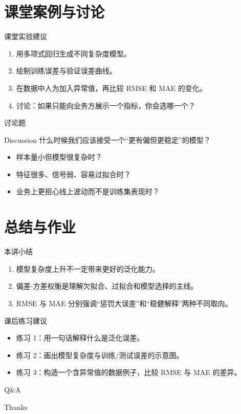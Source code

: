 \documentclass[aspectratio=169,professionalfonts]{beamer}
\begin{document}
\section{课堂案例与讨论}

\begin{frame}{课堂实验建议}
    \begin{enumerate}
        \item 用多项式回归生成不同复杂度模型。
        \item 绘制训练误差与验证误差曲线。
        \item 在数据中人为加入异常值，再比较 RMSE 和 MAE 的变化。
        \item 讨论：如果只能向业务方展示一个指标，你会选哪一个？
    \end{enumerate}
\end{frame}

\begin{frame}{讨论题}
    \begin{block}{Discussion}
        什么时候我们应该接受一个“更有偏但更稳定”的模型？
    \end{block}

    \begin{itemize}
        \item 样本量小但模型很复杂时？
        \item 特征很多、信号弱、容易过拟合时？
        \item 业务上更担心线上波动而不是训练集表现时？
    \end{itemize}
\end{frame}

\section{总结与作业}

\begin{frame}{本讲小结}
    \begin{enumerate}
        \item 模型复杂度上升不一定带来更好的泛化能力。
        \item 偏差-方差权衡是理解欠拟合、过拟合和模型选择的主线。
        \item RMSE 与 MAE 分别强调“惩罚大误差”和“稳健解释”两种不同取向。
    \end{enumerate}
\end{frame}

\begin{frame}{课后练习建议}
    \begin{itemize}
        \item 练习 1：用一句话解释什么是泛化误差。
        \item 练习 2：画出模型复杂度与训练/测试误差的示意图。
        \item 练习 3：构造一个含异常值的数据例子，比较 RMSE 与 MAE 的差异。
    \end{itemize}
\end{frame}

\begin{frame}[plain]
    \centering
    \vspace{1.5cm}
    {\Huge Q\&A}

    \vspace{1cm}
    {\Large Thanks}
\end{frame}
\end{document}

